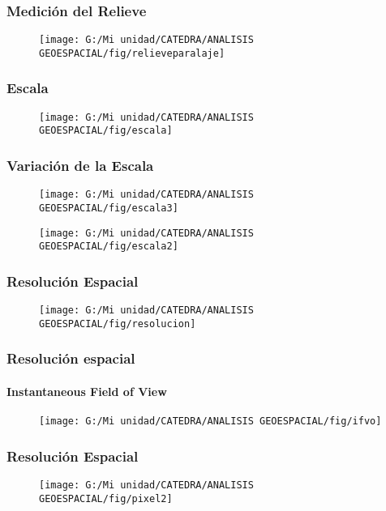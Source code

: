 \documentclass[14pt]{beamer}
\begin{document}
\begin{frame}
\frametitle{Medición del Relieve}
 \begin{figure}
    \centering
    \texttt{[image: G:/Mi unidad/CATEDRA/ANALISIS GEOESPACIAL/fig/relieveparalaje]}
  \end{figure}
\end{frame}
\begin{frame}
\frametitle{Escala}
 \begin{figure}
    \centering
    \texttt{[image: G:/Mi unidad/CATEDRA/ANALISIS GEOESPACIAL/fig/escala]}
  \end{figure}
\end{frame}
\begin{frame}
\frametitle{Variación de la Escala}
 \begin{figure}
    \centering
    \texttt{[image: G:/Mi unidad/CATEDRA/ANALISIS GEOESPACIAL/fig/escala3]}
  \end{figure}
\end{frame}
\begin{frame}
 \begin{figure}
    \centering
    \texttt{[image: G:/Mi unidad/CATEDRA/ANALISIS GEOESPACIAL/fig/escala2]}
  \end{figure}
\end{frame}
\begin{frame}
\frametitle{Resolución Espacial}
 \begin{figure}
    \centering
    \texttt{[image: G:/Mi unidad/CATEDRA/ANALISIS GEOESPACIAL/fig/resolucion]}
  \end{figure}
\end{frame}
\begin{frame}
\frametitle{Resolución espacial}
\framesubtitle{Instantaneous Field of View}
 \begin{figure}
    \centering
    \texttt{[image: G:/Mi unidad/CATEDRA/ANALISIS GEOESPACIAL/fig/ifvo]}
  \end{figure}
\end{frame}
\begin{frame}
\frametitle{Resolución Espacial}
 \begin{figure}
    \centering
    \texttt{[image: G:/Mi unidad/CATEDRA/ANALISIS GEOESPACIAL/fig/pixel2]}
  \end{figure}
\end{frame}
\end{document}
